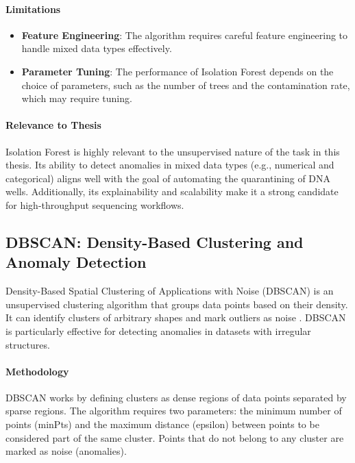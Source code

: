 \paragraph{Limitations}
\begin{itemize}
\item \textbf{Feature Engineering}: The algorithm requires careful feature engineering to handle mixed data types effectively.
\item \textbf{Parameter Tuning}: The performance of Isolation Forest depends on the choice of parameters, such as the number of trees and the contamination rate, which may require tuning.
\end{itemize}

\paragraph{Relevance to Thesis}
Isolation Forest is highly relevant to the unsupervised nature of the task in this thesis. Its ability to detect anomalies in mixed data types (e.g., numerical and categorical) aligns well with the goal of automating the quarantining of DNA wells. Additionally, its explainability and scalability make it a strong candidate for high-throughput sequencing workflows.

\subsection{DBSCAN: Density-Based Clustering and Anomaly Detection}
Density-Based Spatial Clustering of Applications with Noise (DBSCAN) is an unsupervised clustering algorithm that groups data points based on their density. It can identify clusters of arbitrary shapes and mark outliers as noise \cite{ester1996density}. DBSCAN is particularly effective for detecting anomalies in datasets with irregular structures.

\paragraph{Methodology}
DBSCAN works by defining clusters as dense regions of data points separated by sparse regions. The algorithm requires two parameters: the minimum number of points (minPts) and the maximum distance (epsilon) between points to be considered part of the same cluster. Points that do not belong to any cluster are marked as noise (anomalies).

